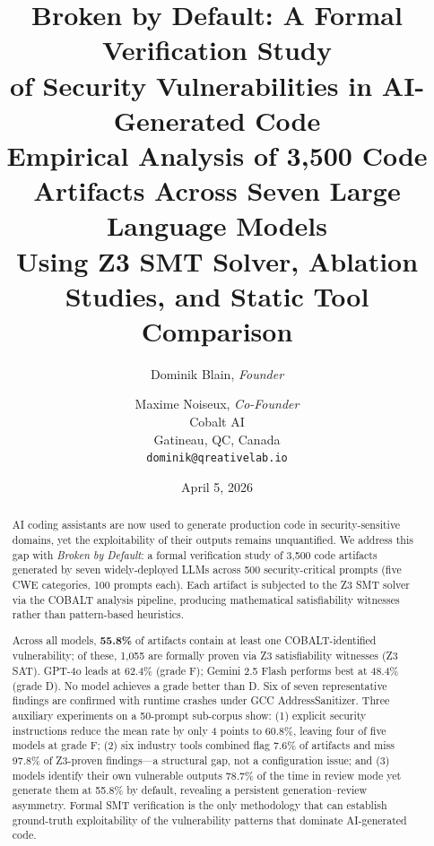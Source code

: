 \documentclass[10pt,twocolumn]{article}
\begin{document}
\title{\textbf{Broken by Default: A Formal Verification Study\\
of Security Vulnerabilities in AI-Generated Code}\\[6pt]
\large Empirical Analysis of 3,500 Code Artifacts Across Seven Large Language Models\\
Using Z3 SMT Solver, Ablation Studies, and Static Tool Comparison}

\author{Dominik Blain, \textit{Founder} \and Maxime Noiseux, \textit{Co-Founder}\\
\small Cobalt AI\\
\small Gatineau, QC, Canada\\
\small \texttt{dominik@qreativelab.io}}
\date{April 5, 2026}

\maketitle

\begin{abstract}
AI coding assistants are now used to generate production code in
security-sensitive domains, yet the exploitability of their outputs
remains unquantified. We address this gap with \textit{Broken by
Default}: a formal verification study of 3,500 code artifacts generated
by seven widely-deployed LLMs across 500 security-critical prompts (five CWE
categories, 100 prompts each). Each artifact is subjected to the Z3 SMT
solver via the COBALT analysis pipeline, producing mathematical
satisfiability witnesses rather than pattern-based heuristics.

Across all models, \textbf{55.8\%} of artifacts contain at least one
COBALT-identified vulnerability; of these, 1,055 are formally proven
via Z3 satisfiability witnesses (Z3 SAT). GPT-4o leads at
62.4\% (grade F); Gemini 2.5 Flash performs best at 48.4\% (grade D).
No model achieves a grade better than D. Six of seven representative
findings are confirmed with runtime crashes under GCC AddressSanitizer.
Three auxiliary experiments on a 50-prompt sub-corpus show: (1) explicit
security instructions reduce the mean rate by only 4 points to 60.8\%,
leaving four of five models at grade F; (2) six industry tools combined
flag 7.6\% of artifacts and miss 97.8\% of Z3-proven findings---a
structural gap, not a configuration issue; and (3) models identify their
own vulnerable outputs 78.7\% of the time in review mode yet generate
them at 55.8\% by default, revealing a persistent generation--review
asymmetry. Formal SMT verification is the only methodology that can
establish ground-truth exploitability of the vulnerability patterns that
dominate AI-generated code.
\end{abstract}
\end{document}
